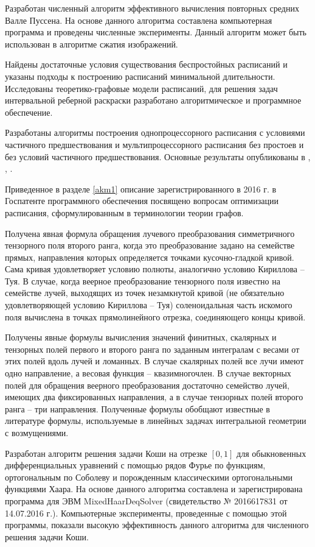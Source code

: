  Разработан численный алгоритм эффективного вычисления повторных средних Валле Пуссена. На основе данного алгоритма составлена компьютерная программа и проведены численные эксперименты. Данный алгоритм может быть использован в алгоритме сжатия изображений.

Найдены достаточные условия существования беспростойных расписаний и указаны подходы к построению расписаний минимальной длительности. Исследованы теоретико-графовые модели расписаний, для решения задач интервальной реберной раскраски разработано алгоритмическое и программное обеспечение.

  Разработаны алгоритмы построения однопроцессорного расписания с условиями частичного предшествования и мультипроцессорного расписания без простоев и без условий частичного предшествования. Основные результаты опубликованы в \cite{akm-DEMI},
	 \cite{akm-artIRJ}, \cite{akm-artDMA}.

Приведенное в разделе \ref{akm1} описание зарегистрированного в 2016 г. в Госпатенте программного обеспечения посвящено вопросам оптимизации расписания, сформулированным в терминологии теории графов.

Получена явная формула обращения лучевого преобразования симметричного тензорного поля второго ранга, когда это преобразование задано на семействе прямых, направления которых определяется точками кусочно-гладкой кривой. Сама кривая удовлетворяет условию полноты, аналогично условию Кириллова -- Туя. В случае, когда веерное преобразование тензорного поля известно на семействе лучей, выходящих из точек незамкнутой кривой (не обязательно удовлетворяющей условию Кириллова -- Туя) соленоидальная часть искомого поля вычислена в точках прямолинейного отрезка, соединяющего концы кривой.

 Получены явные формулы вычисления значений финитных, скалярных и тензорных полей первого и второго ранга по заданным интегралам с весами от этих полей вдоль лучей и ломанных. В случае скалярных полей все лучи имеют одно направление, а весовая функция – квазимногочлен. В случае векторных полей для обращения веерного преобразования достаточно семейство лучей, имеющих два фиксированных направления, а в случае тензорных полей второго ранга – три направления. Полученные формулы обобщают известные в литературе формулы, используемые в линейных задачах интегральной геометрии с возмущениями.


Разработан алгоритм решения задачи Коши на отрезке $[0,1]$ для обыкновенных дифференциальных уравнений с помощью рядов Фурье по функциям, ортогональным по Соболеву и порожденным классическими ортогональными функциями Хаара. На основе данного алгоритма составлена и зарегистрирована программа для ЭВМ MixedHaarDeqSolver (свидетельство № 2016617831 от 14.07.2016 г.). Компьютерные эксперименты, проведенные с помощью этой программы, показали высокую эффективность данного алгоритма для численного решения задачи Коши.


